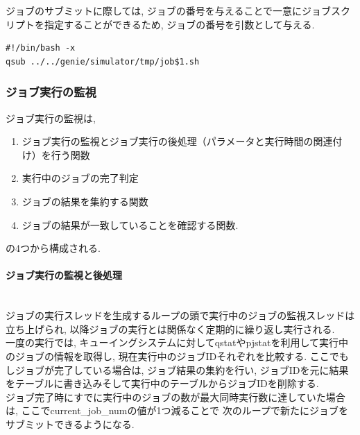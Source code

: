 ジョブのサブミットに際しては, ジョブの番号を与えることで一意にジョブスクリプトを指定することができるため,
ジョブの番号を引数として与える.\\
{\footnotesize
\begin{lstlisting}[numbers=none, caption=ジョブのサブミットスクリプト]
#!/bin/bash -x
qsub ../../genie/simulator/tmp/job$1.sh
\end{lstlisting}
}

\subsubsection{ジョブ実行の監視}
ジョブ実行の監視は,
\begin{enumerate}
\item ジョブ実行の監視とジョブ実行の後処理（パラメータと実行時間の関連付け）を行う関数
\item 実行中のジョブの完了判定
\item ジョブの結果を集約する関数
\item ジョブの結果が一致していることを確認する関数.
\end{enumerate}
の4つから構成される.\\
\paragraph{ジョブ実行の監視と後処理}~\\

ジョブの実行スレッドを生成するループの頭で実行中のジョブの監視スレッドは立ち上げられ,
以降ジョブの実行とは関係なく定期的に繰り返し実行される.\\
一度の実行では, キューイングシステムに対してqstatやpjstatを利用して実行中のジョブの情報を取得し,
現在実行中のジョブIDそれぞれを比較する. ここでもしジョブが完了している場合は,
ジョブ結果の集約を行い, ジョブIDを元に結果をテーブルに書き込みそして実行中のテーブルからジョブIDを削除する.\\
ジョブ完了時にすでに実行中のジョブの数が最大同時実行数に達していた場合は, ここでcurrent\_job\_numの値が1つ減ることで
次のループで新たにジョブをサブミットできるようになる.\\

